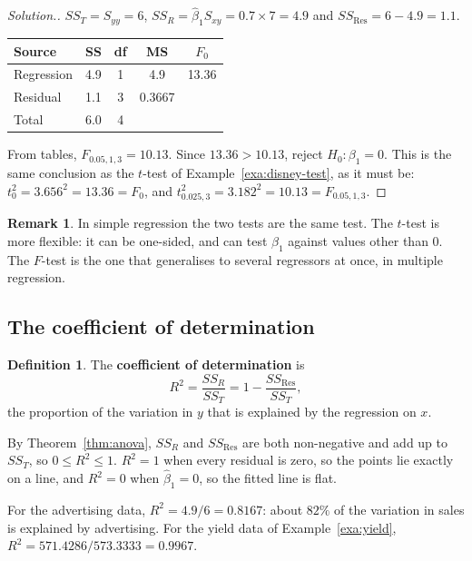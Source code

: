 \documentclass[11pt,a4paper]{article}
\numberwithin{equation}{section}
\theoremstyle{definition}
\newtheorem{defn}[thm]{Definition}
\newtheorem*{remark}{Remark}
\newenvironment{solution}
  {\renewcommand{\qedsymbol}{}\begin{proof}[\textit{Solution}.]}
  {\end{proof}}
\begin{document}
\begin{solution}
$SS_T = S_{yy} = 6$, $SS_R = \hat\beta_1 S_{xy} = 0.7 \times 7 = 4.9$ and
$SS_{\mathrm{Res}} = 6 - 4.9 = 1.1$.
\begin{center}
\begin{tabular}{lcccc}
\hline
Source & SS & df & MS & $F_0$ \\
\hline
Regression & 4.9 & 1 & 4.9 & 13.36 \\
Residual & 1.1 & 3 & 0.3667 & \\
\hline
Total & 6.0 & 4 & & \\
\hline
\end{tabular}
\end{center}
From tables, $F_{0.05,1,3} = 10.13$. Since $13.36 > 10.13$, reject $H_0\colon \beta_1 = 0$.
This is the same conclusion as the $t$-test of Example~\ref{exa:disney-test}, as it must be:
$t_0^2 = 3.656^2 = 13.36 = F_0$, and $t_{0.025,3}^2 = 3.182^2 = 10.13 = F_{0.05,1,3}$.
\end{solution}

\begin{remark}
In simple regression the two tests are the same test. The $t$-test is more flexible: it can
be one-sided, and can test $\beta_1$ against values other than $0$. The $F$-test is the one
that generalises to several regressors at once, in multiple regression.
\end{remark}

\subsection{The coefficient of determination}
\begin{defn}
The \textbf{coefficient of determination} is
\[
R^2 = \frac{SS_R}{SS_T} = 1 - \frac{SS_{\mathrm{Res}}}{SS_T} ,
\]
the proportion of the variation in $y$ that is explained by the regression on $x$.
\end{defn}

By Theorem~\ref{thm:anova}, $SS_R$ and $SS_{\mathrm{Res}}$ are both non-negative and add up to
$SS_T$, so $0 \le R^2 \le 1$. $R^2 = 1$ when every residual is zero, so the points lie
exactly on a line, and $R^2 = 0$ when $\hat\beta_1 = 0$, so the fitted line is flat.

For the advertising data, $R^2 = 4.9/6 = 0.8167$: about $82\%$ of the variation in sales is
explained by advertising. For the yield data of Example~\ref{exa:yield},
$R^2 = 571.4286/573.3333 = 0.9967$.
\end{document}
